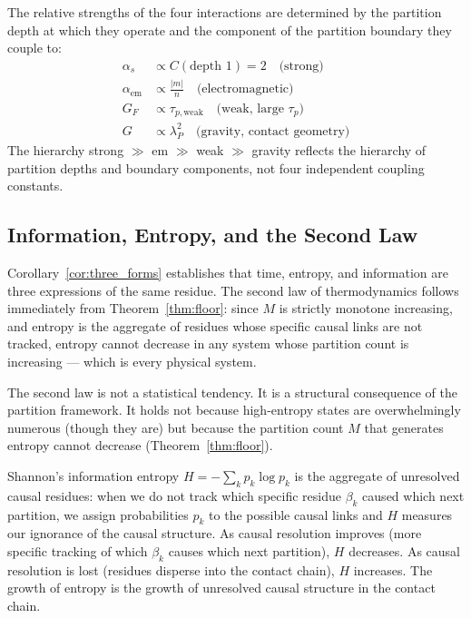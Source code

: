 \begin{theorem}
\label{thm:force_hierarchy}
The relative strengths of the four interactions are determined by the
partition depth at which they operate and the component of the partition
boundary they couple to:
\begin{align}
    \alpha_s &\propto C(\text{depth } 1) = 2 \quad \text{(strong)} \\
    \alpha_{\mathrm{em}} &\propto \frac{|m|}{n} \quad \text{(electromagnetic)} \\
    G_F &\propto \tau_{p,\mathrm{weak}} \quad \text{(weak, large } \tau_p) \\
    G &\propto \lambda_P^2 \quad \text{(gravity, contact geometry)}
\end{align}
The hierarchy strong $\gg$ em $\gg$ weak $\gg$ gravity reflects the hierarchy
of partition depths and boundary components, not four independent coupling
constants.
\end{theorem}

\subsection{Information, Entropy, and the Second Law}
\label{subsec:entropy}

Corollary~\ref{cor:three_forms} establishes that time, entropy, and information
are three expressions of the same residue. The second law of thermodynamics
follows immediately from Theorem~\ref{thm:floor}: since $M$ is strictly monotone
increasing, and entropy is the aggregate of residues whose specific causal links
are not tracked, entropy cannot decrease in any system whose partition count is
increasing --- which is every physical system.

The second law is not a statistical tendency. It is a structural consequence of
the partition framework. It holds not because high-entropy states are
overwhelmingly numerous (though they are) but because the partition count $M$
that generates entropy cannot decrease (Theorem~\ref{thm:floor}).

Shannon's information entropy $H = -\sum_k p_k \log p_k$ is the aggregate of
unresolved causal residues: when we do not track which specific residue $\beta_k$
caused which next partition, we assign probabilities $p_k$ to the possible
causal links and $H$ measures our ignorance of the causal structure. As
causal resolution improves (more specific tracking of which $\beta_k$ causes
which next partition), $H$ decreases. As causal resolution is lost (residues
disperse into the contact chain), $H$ increases. The growth of entropy is the
growth of unresolved causal structure in the contact chain.

